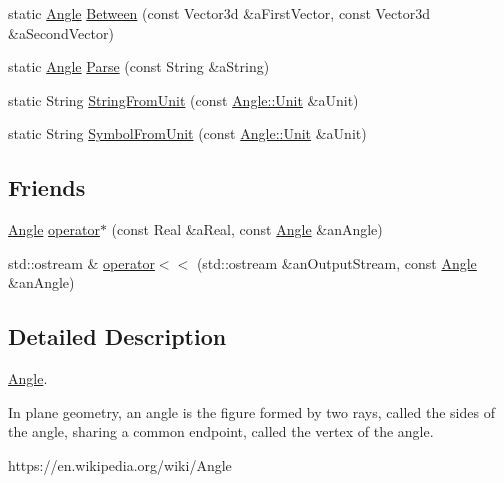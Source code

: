 \begin{DoxyCompactItemize}
\item 
static \hyperlink{classlibrary_1_1math_1_1geom_1_1_angle}{Angle} \hyperlink{classlibrary_1_1math_1_1geom_1_1_angle_a4e409c07a68dede373aa1400605983fe}{Between} (const Vector3d \&a\+First\+Vector, const Vector3d \&a\+Second\+Vector)
\item 
static \hyperlink{classlibrary_1_1math_1_1geom_1_1_angle}{Angle} \hyperlink{classlibrary_1_1math_1_1geom_1_1_angle_a8dad2390bb728ceb7762351171059098}{Parse} (const String \&a\+String)
\item 
static String \hyperlink{classlibrary_1_1math_1_1geom_1_1_angle_a5f3e35152926a4478d427dbc39ade11e}{String\+From\+Unit} (const \hyperlink{classlibrary_1_1math_1_1geom_1_1_angle_ab593c4dafbb9a5c29fdbe114eaae8eae}{Angle\+::\+Unit} \&a\+Unit)
\item 
static String \hyperlink{classlibrary_1_1math_1_1geom_1_1_angle_a06d1a87ebfc87b334d9fb6d408422fb9}{Symbol\+From\+Unit} (const \hyperlink{classlibrary_1_1math_1_1geom_1_1_angle_ab593c4dafbb9a5c29fdbe114eaae8eae}{Angle\+::\+Unit} \&a\+Unit)
\end{DoxyCompactItemize}
\subsection*{Friends}
\begin{DoxyCompactItemize}
\item 
\hyperlink{classlibrary_1_1math_1_1geom_1_1_angle}{Angle} \hyperlink{classlibrary_1_1math_1_1geom_1_1_angle_af699984b24759466957ecddaa7e61fc9}{operator$\ast$} (const Real \&a\+Real, const \hyperlink{classlibrary_1_1math_1_1geom_1_1_angle}{Angle} \&an\+Angle)
\item 
std\+::ostream \& \hyperlink{classlibrary_1_1math_1_1geom_1_1_angle_a0846b77ee3281e8a559197c3c3208eed}{operator$<$$<$} (std\+::ostream \&an\+Output\+Stream, const \hyperlink{classlibrary_1_1math_1_1geom_1_1_angle}{Angle} \&an\+Angle)
\end{DoxyCompactItemize}


\subsection{Detailed Description}
\hyperlink{classlibrary_1_1math_1_1geom_1_1_angle}{Angle}. 

In plane geometry, an angle is the figure formed by two rays, called the sides of the angle, sharing a common endpoint, called the vertex of the angle.

https\+://en.wikipedia.\+org/wiki/\+Angle 

